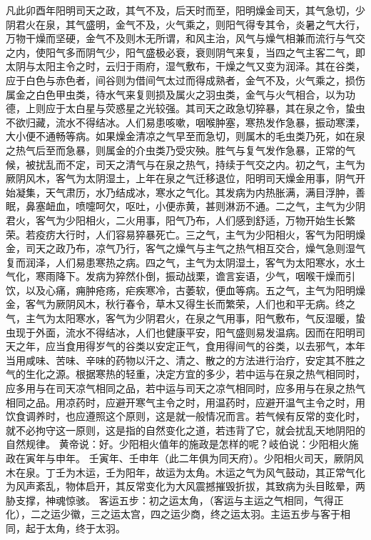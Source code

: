 \documentclass[a4paper,12pt,UTF8,twoside]{ctexbook}
\begin{document}
凡此卯酉年阳明司天之政，其气不及，后天时而至，阳明燥金司天，其气急切，少阴君火在泉，其气盛明，金气不及，火气乘之，则阳气得专其令，炎暑之气大行，万物干燥而坚硬，金气不及则木无所谓，和风主治，风气与燥气相兼而流行与气交之内，使阳气多而阴气少，阳气盛极必衰，衰则阴气来复，当四之气主客二气，即太阴与太阳主令之时，云归于雨府，湿气敷布，干燥之气又变为润泽。其在谷类，应于白色与赤色者，间谷则为借间气太过而得成熟者，金气不及，火气乘之，损伤属金之白色甲虫类，待水气来复则损及属火之羽虫类，金气与火气相合，以为功德，上则应于太白星与荧惑星之光较强。其司天之政急切猝暴，其在泉之令，蛰虫不欲归藏，流水不得结冰。人们易患咳嗽，咽喉肿塞，寒热发作急暴，振动寒溧，大小便不通畅等病。如果燥金清凉之气早至而急切，则属木的毛虫类乃死，如在泉之热气后至而急暴，则属金的介虫类乃受灾殃。胜气与复气发作急暴，正常的气候，被扰乱而不定，司天之清气与在泉之热气，持续于气交之内。初之气，主气为厥阴风木，客气为太阴湿土，上年在泉之气迁移退位，阳明司天燥金用事，阴气开始凝集，天气肃历，水乃结成冰，寒水之气化。其发病为内热胀满，满目浮肿，善眠，鼻塞衄血，喷嚏呵欠，呕吐，小便赤黄，甚则淋沥不通。二之气，主气为少阴君火，客气为少阳相火，二火用事，阳气乃布，人们感到舒适，万物开始生长繁荣。若疫疠大行时，人们容易猝暴死亡。三之气，主气为少阳相火，客气为阳明燥金，司天之政乃布，凉气乃行，客气之燥气与主气之热气相互交合，燥气急则湿气复而润泽，人们易患寒热之病。四之气，主气为太阴湿土，客气为太阳寒水，水土气化，寒雨降下。发病为猝然仆倒，振动战栗，谵言妄语，少气，咽喉干燥而引饮，以及心痛，痈肿疮疡，疟疾寒冷，古萎软，便血等病。五之气，主气为阳明燥金，客气为厥阴风木，秋行春令，草木又得生长而繁荣，人们也和平无病。终之气，主气为太阳寒水，客气为少阴君火，在泉之气用事，阳气敷布，气反湿暖，蛰虫现于外面，流水不得结冰，人们也健康平安，阳气盛则易发温病。因而在阳明司天之年，应当食用得岁气的谷类以安定正气，食用得间气的谷类，以去邪气，本年当用咸味、苦味、辛味的药物以汗之、清之、散之的方法进行治疗，安定其不胜之气的生化之源。根据寒热的轻重，决定方宜的多少，若中运与在泉之热气相同时，应多用与在司天凉气相同之品，若中运与司天之凉气相同时，应多用与在泉之热气相同之品。用凉药时，应避开寒气主令之时，用温药时，应避开温气主令之时，用饮食调养时，也应遵照这个原则，这是就一般情况而言。若气候有反常的变化时，就不必拘守这一原则，这是指的自然变化之道，若违背了它，就会扰乱天地阴阳的自然规律。
黄帝说：好。少阳相火值年的施政是怎样的呢？岐伯说：少阳相火施政在寅年与申年。
壬寅年、壬申年（此二年俱为同天府）。少阳相火司天，厥阴风木在泉。丁壬为木运，壬为阳年，故运为太角。木运之气为风气鼓动，其正常气化为风声紊乱，物体启开，其反常变化为大风震撼摧毁折拔，其致病为头目眩晕，两胁支撑，神魂惊骇。
客运五步：初之运太角，（客运与主运之气相同，气得正化），二之运少徽，三之运太宫，四之运少商，终之运太羽。主运五步与客于相同，起于太角，终于太羽。
\end{document}
